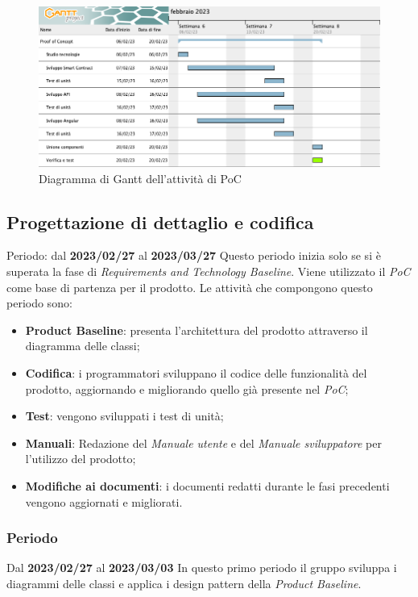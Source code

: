 \begin{figure}[H]
    \centering
    \includegraphics[scale=0.4]{src/img/Gantt PoC.png}
    \caption{Diagramma di Gantt dell'attività di PoC}
\end{figure}

\subsection{Progettazione di dettaglio e codifica}
Periodo: dal \textbf{2023/02/27} al \textbf{2023/03/27} \newline
Questo periodo inizia solo se si è superata la fase di \textit{Requirements and Technology Baseline}. Viene utilizzato il \textit{PoC}
come base di partenza per il prodotto. Le attività che compongono questo periodo sono:
\begin{itemize}
        \item \textbf{Product Baseline\glo}: presenta l'architettura del prodotto attraverso il diagramma delle classi;
        \item \textbf{Codifica}: i programmatori sviluppano il codice delle funzionalità del prodotto, aggiornando e migliorando quello già presente nel \textit{PoC};
        \item \textbf{Test}: vengono sviluppati i test di unità;
        \item \textbf{Manuali}: Redazione del \textit{Manuale utente} e del \textit{Manuale sviluppatore} per l'utilizzo del prodotto;
        \item \textbf{Modifiche ai documenti}: i documenti redatti durante le fasi precedenti vengono aggiornati e migliorati.
\end{itemize}

\subsubsection{ Periodo}
Dal \textbf{2023/02/27} al \textbf{2023/03/03}
\newline
In questo primo periodo il gruppo sviluppa i diagrammi delle classi e applica i design pattern della \textit{Product Baseline}.
